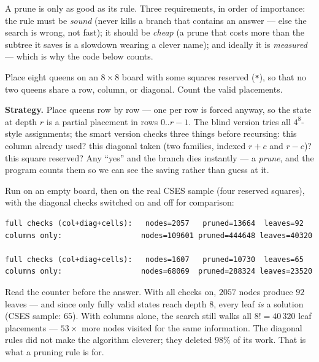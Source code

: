 A prune is only as good as its rule. Three requirements, in order of
importance: the rule must be \emph{sound} (never kills a branch that contains
an answer --- else the search is wrong, not fast); it should be \emph{cheap}
(a prune that costs more than the subtree it saves is a slowdown wearing a
clever name); and ideally it is \emph{measured} --- which is why the code
below counts.

\begin{example}\label{ex:queens}
Place eight queens on an $8 \times 8$ board with some squares reserved
(\texttt{*}), so that no two queens share a row, column, or diagonal. Count
the valid placements.
\par\smallskip
\textbf{Strategy.} Place queens row by row --- one per row is forced anyway,
so the state at depth $r$ is a partial placement in rows $0..r-1$. The blind
version tries all $4^8$-style assignments; the smart version checks three
things before recursing: this column already used? this diagonal taken (two
families, indexed $r+c$ and $r-c$)? this square reserved? Any ``yes'' and the
branch dies instantly --- a \emph{prune}, and the program counts them so we
can see the saving rather than guess at it.
\par\smallskip
\begin{solution}

Run on an empty board, then on the real CSES sample (four reserved squares),
with the diagonal checks switched on and off for comparison:
\begin{lstlisting}[numbers=none]
full checks (col+diag+cells):   nodes=2057   pruned=13664  leaves=92
columns only:                  nodes=109601 pruned=444648 leaves=40320

full checks (col+diag+cells):   nodes=1607   pruned=10730  leaves=65
columns only:                  nodes=68069  pruned=288324 leaves=23520
\end{lstlisting}
Read the counter before the answer. With all checks on, $2057$ nodes produce
$92$ leaves --- and since only fully valid states reach depth 8, every leaf
\emph{is} a solution (CSES sample: $65$). With columns alone, the search still
walks all $8! = 40\,320$ leaf placements --- $53\times$ more nodes visited for
the same information. The diagonal rules did not make the algorithm cleverer;
they deleted 98\% of its work. That is what a pruning rule is for.
\end{solution}
\end{example}

